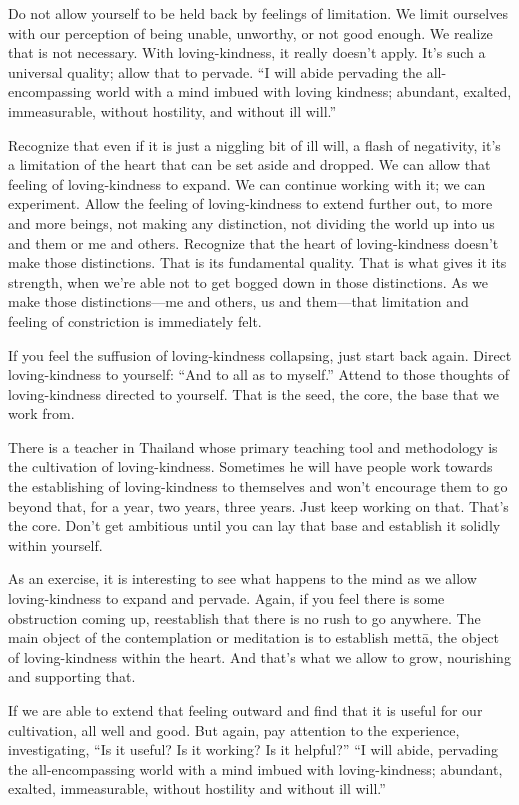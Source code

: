 Do not allow yourself to be held back by feelings of limitation. We
limit ourselves with our perception of being unable, unworthy, or not
good enough. We realize that is not necessary. With loving-kindness, it
really doesn’t apply. It’s such a universal quality; allow that to
pervade. “I will abide pervading the all-encompassing world with a mind
imbued with loving kindness; abundant, exalted, immeasurable, without
hostility, and without ill will.”

Recognize that even if it is just a niggling bit of ill will, a flash of
negativity, it’s a limitation of the heart that can be set aside and
dropped. We can allow that feeling of loving-kindness to expand. We can
continue working with it; we can experiment. Allow the feeling of
loving-kindness to extend further out, to more and more beings, not
making any distinction, not dividing the world up into us and them or me
and others. Recognize that the heart of loving-kindness doesn’t make
those distinctions. That is its fundamental quality. That is what gives
it its strength, when we’re able not to get bogged down in those
distinctions. As we make those distinctions—me and others, us and
them—that limitation and feeling of constriction is immediately felt.

If you feel the suffusion of loving-kindness collapsing, just start back
again. Direct loving-kindness to yourself: “And to all as to myself.”
Attend to those thoughts of loving-kindness directed to yourself. That
is the seed, the core, the base that we work from.

There is a teacher in Thailand whose primary teaching tool and
methodology is the cultivation of loving-kindness. Sometimes he will
have people work towards the establishing of loving-kindness to
themselves and won’t encourage them to go beyond that, for a year, two
years, three years. Just keep working on that. That’s the core. Don’t
get ambitious until you can lay that base and establish it solidly
within yourself.

As an exercise, it is interesting to see what happens to the mind as we
allow loving-kindness to expand and pervade. Again, if you feel there is
some obstruction coming up, reestablish that there is no rush to go
anywhere. The main object of the contemplation or meditation is to
establish mettā, the object of loving-kindness within the heart. And
that’s what we allow to grow, nourishing and supporting that.

If we are able to extend that feeling outward and find that it is useful
for our cultivation, all well and good. But again, pay attention to the
experience, investigating, “Is it useful? Is it working? Is it helpful?”
“I will abide, pervading the all-encompassing world with a mind imbued
with loving-kindness; abundant, exalted, immeasurable, without hostility
and without ill will.”
